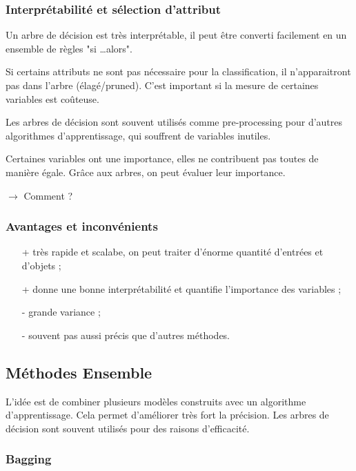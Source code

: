 \documentclass[10pt,a4paper]{report}
\begin{document}
			\subsubsection{Interprétabilité et sélection d'attribut}
			
			Un arbre de décision est très interprétable, il peut être converti facilement en un ensemble de règles "si \dots alors".
			
			Si certains attributs ne sont pas nécessaire pour la classification, il n'apparaitront pas dans l'arbre (élagé/pruned). C'est important si la mesure de certaines variables est coûteuse.
			
			Les arbres de décision sont souvent utilisés comme pre-processing pour d'autres algorithmes d'apprentissage, qui souffrent de variables inutiles.
			
			Certaines variables ont une importance, elles ne contribuent pas toutes de manière égale. Grâce aux arbres, on peut évaluer leur importance.
			
			$\longrightarrow$ Comment ?
			
			\subsubsection{Avantages et inconvénients}
			
			\begin{itemize}
				\item[+] très rapide et scalabe, on peut traiter d'énorme quantité d'entrées et d'objets ;
				\item[+] donne une bonne interprétabilité et quantifie l'importance des variables ;
				\item[-] grande variance ;
				\item[-] souvent pas aussi précis que d'autres méthodes.
			\end{itemize}
			
		\subsection{Méthodes Ensemble}
		
		L'idée est de combiner plusieurs modèles construits avec un algorithme d'apprentissage. Cela permet d'améliorer très fort la précision. Les arbres de décision sont souvent utilisés pour des raisons d'efficacité.
		
			\subsubsection{Bagging}
			
\end{document}
